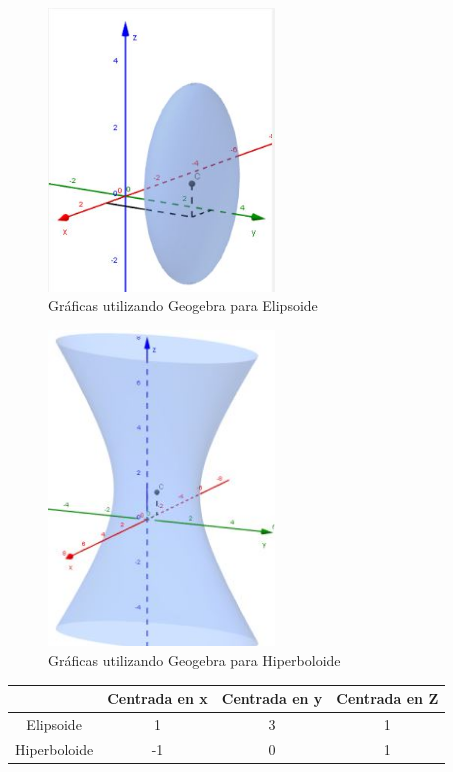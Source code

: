 \begin{figure}[H]
    \centering
    \includegraphics[width=6cm]{imagenes/Captura.jpg}
    \caption{Gráficas utilizando Geogebra para Elipsoide}
\end{figure}

\begin{figure}[hbtp]
    \centering
    \includegraphics[width=6cm]{imagenes/Captura2.jpg}
    \caption{Gráficas utilizando Geogebra para Hiperboloide}
\end{figure}

\begin{tabular}{|c|c|c|c|}
    \hline
                 & Centrada en x & Centrada en y & Centrada en Z \\
    \hline
    Elipsoide    & 1             & 3             & 1             \\
    \hline
    Hiperboloide & -1            & 0             & 1             \\
    \hline
\end{tabular}
